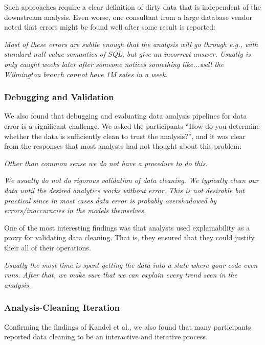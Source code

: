 \vspace{0.5em}

Such approaches require a clear definition of dirty data that is independent of the downstream analysis. Even worse, one consultant from a large database vendor noted that errors might be found well after some result is reported:

\vspace{0.5em}
\emph{Most of these errors are subtle enough that the analysis will go through e.g., with standard null value semantics of SQL, but give an incorrect answer. Usually is only caught weeks later after someone notices something like...well the Wilmington branch cannot have 1M sales in a week.}

\subsubsection{Debugging and Validation}
We also found that debugging and evaluating data analysis pipelines for data error is a significant challenge. We asked the participants ``How do you determine whether the data is sufficiently clean to trust the analysis?'', and it was clear from the responses that most analysts had not thought about this problem:

\vspace{0.5em}
\emph{Other than common sense we do not have a procedure to do this.}

\vspace{0.7em}
\emph{We usually do not do rigorous validation of data cleaning. We typically clean our data until the desired analytics works without error. This is not desirable but practical since in most cases data error is probably overshadowed by errors/inaccuracies in the models themselves.}

\vspace{0.5em}

One of the most interesting findings was that analysts used explainability as a proxy for validating data cleaning. That is, they ensured that they could justify their all of their operations.

\vspace{0.5em}
\emph{Usually the most time is spent getting the data into a state where your code even runs. After that, we make sure that we can explain every trend seen in the analysis.}

\subsubsection{Analysis-Cleaning Iteration}
Confirming the findings of Kandel et al., we also found that many participants reported data cleaning to be an interactive and iterative process.


